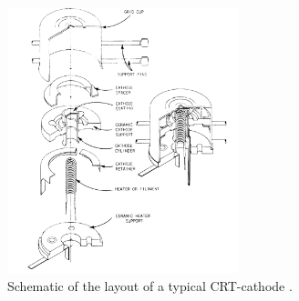 \begin{figure}
	\centering
	\includegraphics[width=0.6\textwidth]{Chapters/CRT-Basics/Cathode_layout}
	\caption{Schematic of the layout of a typical CRT-cathode \cite{deVere69}.}
	\label{fig:cathodelayout}
\end{figure}














